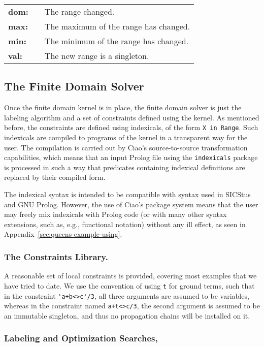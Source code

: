 \documentclass{llncs}
\newcommand{\fd}{\xspace}
\begin{document}
\begin{tabular}{lll}
\textbf{dom:} & & The range changed. \\
\textbf{max:} & & The maximum of the range has changed. \\
\textbf{min:} & & The minimum of the range has changed. \\
\textbf{val:} & & The new range is a singleton. \\
\end{tabular}

\subsection{The Finite Domain Solver}

Once the finite domain kernel is in place, the finite domain solver is
just the labeling algorithm and a set of constraints defined using the
kernel. As mentioned before, the constraints are defined using
indexicals, of the form \verb!X in Range!. Such indexicals are
compiled to programs of the \fd kernel in a transparent way for the
user. The compilation is carried out by Ciao's source-to-source
transformation capabilities, which means that an input Prolog file
using the \verb!indexicals! package is processed in such a way that
predicates containing indexical definitions are replaced by their
compiled form.

The indexical syntax is intended to be compatible with syntax used in
SICStus and GNU Prolog. However, the use of Ciao's package system
means that the user may freely mix indexicals with Prolog code (or
with many other syntax extensions, such as, e.g., functional notation)
without any ill effect, as seen in
Appendix~\ref{sec:queens-example-using}.

\subsubsection{The Constraints Library.}
A reasonable set of local constraints is provided, covering most
examples that we have tried to date. We use the convention of using
\verb!t! for ground terms, such that in the constraint
\verb!'a+b<>c'/3!, all three arguments are assumed to be \fd
variables, whereas in the constraint named \verb!a+t<>c/3!, the second
argument is assumed to be an immutable singleton, and thus no
propagation chains will be installed on it.

\subsubsection{Labeling and Optimization Searches,}
\end{document}
